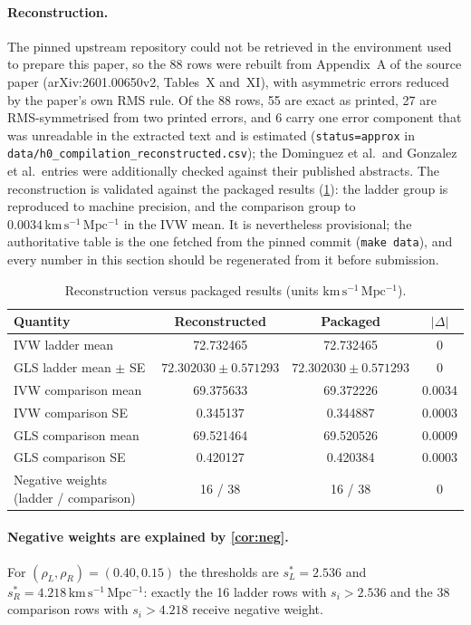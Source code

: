 \documentclass[11pt,a4paper]{article}
\theoremstyle{remark}\newtheorem{remark}{Remark}
\newcommand{\kmsMpc}{\mathrm{km\,s^{-1}\,Mpc^{-1}}}
\newcommand{\unit}{\,\kmsMpc}
\begin{document}
\paragraph{Reconstruction.} The pinned upstream repository could not be retrieved in the environment used to prepare this paper, so the 88 rows were rebuilt from Appendix~A of the source paper (arXiv:2601.00650v2, Tables~X and~XI), with asymmetric errors reduced by the paper's own RMS rule. Of the 88 rows, 55 are exact as printed, 27 are RMS-symmetrised from two printed errors, and 6 carry one error component that was unreadable in the extracted text and is estimated (\texttt{status=approx} in \texttt{data/h0\_compilation\_reconstructed.csv}); the Dominguez et al.\ and Gonzalez et al.\ entries were additionally checked against their published abstracts. The reconstruction is validated against the packaged results (\cref{tab:valid}): the ladder group is reproduced to machine precision, and the comparison group to $0.0034\unit$ in the IVW mean. It is nevertheless provisional; the authoritative table is the one fetched from the pinned commit (\texttt{make data}), and every number in this section should be regenerated from it before submission.
\begin{table}[t]\centering\small
\caption{Reconstruction versus packaged results (units $\kmsMpc$).}\label{tab:valid}
\begin{tabular}{@{}lccc@{}}\toprule
Quantity & Reconstructed & Packaged & $|\Delta|$\\\midrule
IVW ladder mean & 72.732465 & 72.732465 & 0\\
GLS ladder mean $\pm$ SE & $72.302030\pm0.571293$ & $72.302030\pm0.571293$ & 0\\
IVW comparison mean & 69.375633 & 69.372226 & 0.0034\\
IVW comparison SE & 0.345137 & 0.344887 & 0.0003\\
GLS comparison mean & 69.521464 & 69.520526 & 0.0009\\
GLS comparison SE & 0.420127 & 0.420384 & 0.0003\\
Negative weights (ladder / comparison) & 16 / 38 & 16 / 38 & 0\\\bottomrule
\end{tabular}\end{table}

\paragraph{Negative weights are explained by \cref{cor:neg}.} For $(\rho_L,\rho_R)=(0.40,0.15)$ the thresholds are $s^\ast_L=2.536$ and $s^\ast_R=4.218\unit$: exactly the 16 ladder rows with $s_i>2.536$ and the 38 comparison rows with $s_i>4.218$ receive negative weight.
\end{document}
